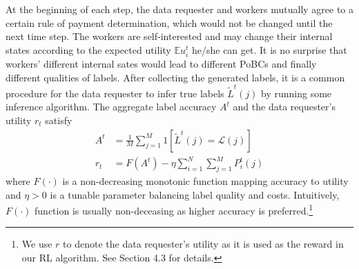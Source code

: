  
At the beginning of each step, the data requester and workers mutually agree to a certain rule of payment determination, which would not be changed until the next time step.
The workers are self-interested and may change their internal states according to the expected utility $\mathbb{E}u_i^t$ he/she can get. It is no surprise that workers' different internal sates would lead to different PoBCs and finally different qualities of labels. After collecting the generated labels, it is a common procedure for the data requester to infer true labels $\tilde{L}^t(j)$ by running some inference algorithm.
The aggregate label accuracy $A^t$ and the data requester's utility $r_t$ satisfy
\begin{equation}
\label{equation:utility}
\begin{split}
A^t&=\frac{1}{M}{\sum}_{j=1}^{M}1\left[\tilde{L}^{t}(j)=\mathcal{L}(j)\right]\\
r_t &= F(A^t) - \eta {\sum}_{i=1}^{N}{\sum}_{j=1}^{M}P^t_i(j)
\end{split}
\end{equation}
where $F(\cdot)$ is a non-decreasing monotonic function mapping accuracy to utility and $\eta>0$ is a tunable parameter balancing label quality and costs. Intuitively, $F(\cdot)$ function is usually non-deceasing as higher accuracy is preferred.\footnote{We use $r$ to denote the data requester's utility as it is used as the reward in our RL algorithm. See Section 4.3 for details.} 


